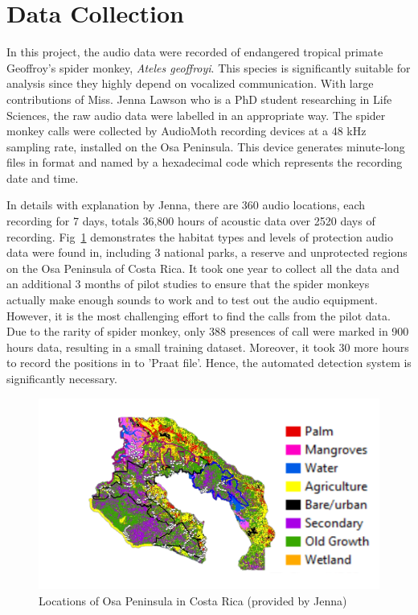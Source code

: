 \section{Data Collection}
In this project, the audio data were recorded of endangered tropical primate Geoffroy's spider monkey, \textit {Ateles geoffroyi}. This species is significantly suitable for analysis since they highly depend on vocalized communication. With large contributions of Miss. Jenna Lawson who is a PhD student researching in Life Sciences, the raw audio data were labelled in an appropriate way. The spider monkey calls were collected by AudioMoth recording devices at a 48 kHz sampling rate, installed on the Osa Peninsula. This device generates minute-long files in  format and named by a hexadecimal code which represents the recording date and time. \par
In details with explanation by Jenna, there are 360 audio locations, each recording for 7 days, totals 36,800 hours of acoustic data over 2520 days of recording. Fig~\ref{fig:locations} demonstrates the habitat types and levels of protection audio data were found in, including 3 national parks, a reserve and unprotected regions on the Osa Peninsula of Costa Rica. It took one year to collect all the data and an additional 3 months of pilot studies to ensure that the spider monkeys actually make enough sounds to work and to test out the audio equipment. However, it is the most challenging effort to find the calls from the pilot data. Due to the rarity of spider monkey, only 388 presences of call were marked in 900 hours data, resulting in a small training dataset. Moreover, it took 30 more hours to record the positions in to 'Praat file'. Hence, the automated detection system is significantly necessary.

\begin{figure}[htp]
\centering
\includegraphics[scale=0.8]{Figs/intro/locations.pdf}
\caption{Locations of Osa Peninsula in Costa Rica (provided by Jenna)}
\label{fig:locations}
\end{figure}

